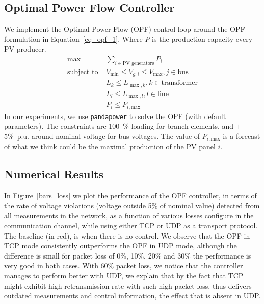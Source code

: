 \documentclass[conference]{IEEEtran}
\begin{document}
\subsection{Optimal Power Flow Controller}\label{opf_controller}

We implement the Optimal Power Flow (OPF) control loop around the OPF formulation in Equation~\eqref{eq_opf_1}. Where $P$ is the production capacity every PV producer.
\begin{equation}\label{eq_opf_1}
\begin{split}
	\max & \sum_{i \in \text{PV generators}}{P_i} \\
	\text{subject to } 
	& V_{\min} \leqslant V_{g,i}  \leqslant V_{\max}, j\in\text{bus} \\
	& L_{k} \leqslant L_{\max,k}, k\in\text{transformer} \\
	& L_{l} \leqslant L_{\max,l}, l\in\text{line}\\
	& P_i \leqslant P_{i,\mathrm{max}}
\end{split}
\end{equation}
In our experiments, we use \texttt{pandapower} to solve the OPF (with default parameters). 
The constraints are 100~\% loading for branch elements, and $\pm$5\%~p.u. around nominal voltage for bus voltages. The value of $P_{i,\text{max}}$ is a forecast of what we think could be the maximal production of the PV panel $i$.

\subsection{Numerical Results}

In Figure~\ref{bars_loss} we plot the performance of the OPF controller, in terms of the rate of voltage violations (voltage outside 5\% of nominal value) detected from all measurements in the network, as a function of various losses configure in the communication channel, while using either TCP or UDP as a transport protocol.
The baseline (in red), is when there is no control. We observe that the OPF in TCP mode consistently outperforms the OPF in UDP mode, although the difference is small for packet loss of 0\%, 10\%, 20\% and 30\% the performance is very good in both cases. With 60\% packet loss, we notice that the controller manages to perform better with UDP, we explain that by the fact that TCP might exhibit high retransmission rate with such high packet loss, thus delivers outdated measurements and control information, the effect that is absent in UDP.
\end{document}
